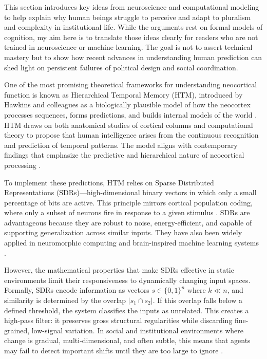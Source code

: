 \documentclass[12pt]{article}  %
\begin{document}
This section introduces key ideas from neuroscience and computational modeling to help explain why human beings struggle to perceive and adapt to pluralism and complexity in institutional life. While the arguments rest on formal models of cognition, my aim here is to translate those ideas clearly for readers who are not trained in neuroscience or machine learning. The goal is not to assert technical mastery but to show how recent advances in understanding human prediction can shed light on persistent failures of political design and social coordination.

One of the most promising theoretical frameworks for understanding neocortical function is known as Hierarchical Temporal Memory (HTM), introduced by Hawkins and colleagues as a biologically plausible model of how the neocortex processes sequences, forms predictions, and builds internal models of the world \parencite{hawkins2004intelligence, hawkins2021thousand}. HTM draws on both anatomical studies of cortical columns and computational theory to propose that human intelligence arises from the continuous recognition and prediction of temporal patterns. The model aligns with contemporary findings that emphasize the predictive and hierarchical nature of neocortical processing \parencite{friston2005theory, buesing2011neural}.

To implement these predictions, HTM relies on Sparse Distributed Representations (SDRs)—high-dimensional binary vectors in which only a small percentage of bits are active. This principle mirrors cortical population coding, where only a subset of neurons fire in response to a given stimulus \parencite{olshausen1996emergence, ganguli2012compressed}. SDRs are advantageous because they are robust to noise, energy-efficient, and capable of supporting generalization across similar inputs. They have also been widely applied in neuromorphic computing and brain-inspired machine learning systems \parencite{Tsinos2024sdr}.

However, the mathematical properties that make SDRs effective in static environments limit their responsiveness to dynamically changing input spaces. Formally, SDRs encode information as vectors \( s \in \{0,1\}^n \) where \( k \ll n \), and similarity is determined by the overlap \( |s_1 \cap s_2| \). If this overlap falls below a defined threshold, the system classifies the inputs as unrelated. This creates a high-pass filter: it preserves gross structural regularities while discarding fine-grained, low-signal variation. In social and institutional environments where change is gradual, multi-dimensional, and often subtle, this means that agents may fail to detect important shifts until they are too large to ignore \parencite{george2011towards}.
\end{document}
